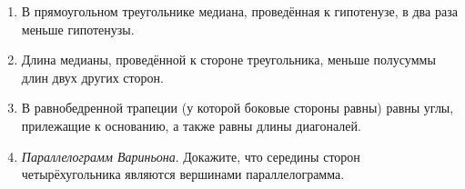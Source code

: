 \documentclass{article}
\begin{document}
\begin{enumerate}[label*=\protect\fbox{\arabic{enumi}}]

\item  В прямоугольном треугольнике медиана, проведённая к гипотенузе, в два раза меньше гипотенузы.

\item Длина медианы, проведённой к стороне треугольника, меньше полусуммы длин двух других сторон.

\item В равнобедренной трапеции (у которой боковые стороны равны) равны углы, прилежащие к основанию, а также равны длины диагоналей.

\item \textit{Параллелограмм Вариньона}. Докажите, что середины сторон четырёхугольника являются вершинами параллелограмма.

\end{enumerate}
\end{document}
